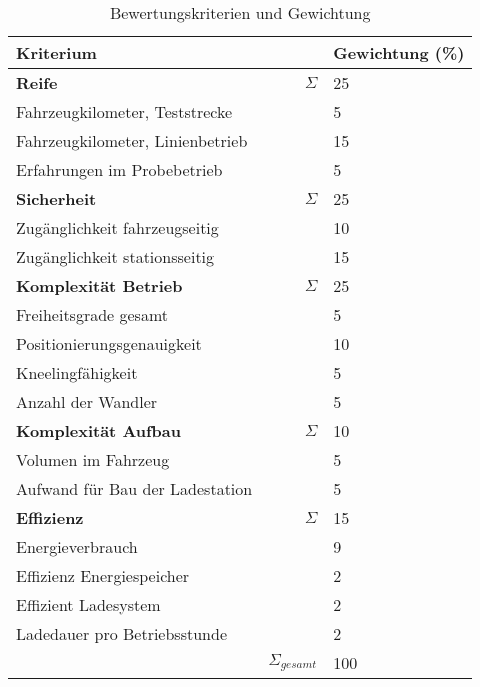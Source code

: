 \begin{table}
	\centering
	\begin{tabularx}{\linewidth}{Xrl}
		\toprule
		Kriterium                        &                   & Gewichtung (\%) \\ \midrule
		\textbf{Reife}                   & $\Sigma$          & 25                    \\
		Fahrzeugkilometer, Teststrecke   &                   & 5                     \\
		Fahrzeugkilometer, Linienbetrieb &                   & 15                    \\
		Erfahrungen im Probebetrieb      &                   & 5                     \\ \midrule
		\textbf{Sicherheit}              & $\Sigma$          & 25                    \\
		Zugänglichkeit fahrzeugseitig    &                   & 10                    \\
		Zugänglichkeit stationsseitig    &                   & 15                    \\ \midrule
		\textbf{Komplexität Betrieb}     & $\Sigma$          & 25                    \\
		Freiheitsgrade gesamt            &                   & 5                     \\
		Positionierungsgenauigkeit       &                   & 10                    \\
		Kneelingfähigkeit                &                   & 5                     \\
		Anzahl der Wandler               &                   & 5                     \\ \midrule
		\textbf{Komplexität Aufbau}      & $\Sigma$          & 10                    \\
		Volumen im Fahrzeug              &                   & 5                     \\
		Aufwand für Bau der Ladestation  &                   & 5                     \\ \midrule
		\textbf{Effizienz}               & $\Sigma$          & 15                    \\
		Energieverbrauch                 &                   & 9                     \\
		Effizienz Energiespeicher        &                   & 2                     \\
		Effizient Ladesystem             &                   & 2                     \\
		Ladedauer pro Betriebsstunde     &                   & 2                     \\ \bottomrule
		                                 & $\Sigma_{gesamt}$ & 100
	\end{tabularx}
	\label{tab_bewertungskriterien}
	\caption{Bewertungskriterien und Gewichtung}
\end{table} 

